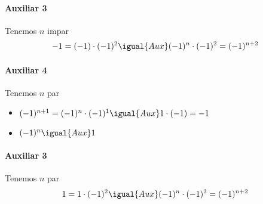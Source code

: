 \begin{enumerate}[label=\roman*)]
        \paragraph{Auxiliar 3}{
          Tenemos $n$ impar
          \begin{align*}
            -1 = (-1) \cdot (-1)^2 \igual{Aux} (-1)^n \cdot (-1)^2 = (-1)^{n+2}
          \end{align*}
        }

        \paragraph{Auxiliar 4}{
          Tenemos $n$ par
          \begin{itemize}
            \item $(-1)^{n+1} = (-1)^n \cdot (-1)^1 \igual{Aux} 1 \cdot (-1) = -1$
            \item $(-1)^n \igual{Aux} 1$
          \end{itemize}
        }

        \paragraph{Auxiliar 3}{
          Tenemos $n$ par
          \begin{align*}
            1 = 1 \cdot (-1)^2 \igual{Aux} (-1)^n \cdot (-1)^2 = (-1)^{n+2}
          \end{align*}
        }
\end{enumerate}

\begin{aportes}
  \item {}
\end{aportes}


